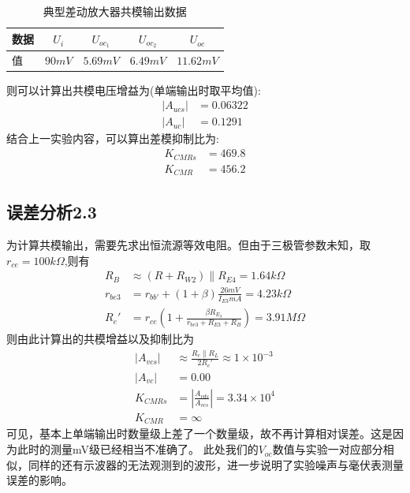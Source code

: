 \documentclass[a4paper,11pt,UTF8]{ctexart}
\begin{document}
	\begin{table}[!h!tbp]
		\caption{典型差动放大器共模输出数据}\label{tab:ncTab}
		\centering
		\begin{tabular}{|l|c|c|c|c|}
			\hline
			数据 &$U_{i}$&$U_{oc_1}$&$U_{oc_2}$&$U_{oc}$         \\ \hline
			值   &$90mV$&$5.69mV$&$6.49mV$&$11.62mV$     \\ \hline
		\end{tabular}
	\end{table}
	则可以计算出共模电压增益为(单端输出时取平均值):
	\begin{equation}
		\begin{aligned}
			\left | A_{ucs}\right |&=0.06322\\
			\left | A_{uc}\right |&=0.1291
		\end{aligned}
	\end{equation}
	结合上一实验内容，可以算出差模抑制比为:
	\begin{equation}
		\begin{aligned}
			K_{CMRs}&=469.8\\
			K_{CMR}&=456.2
		\end{aligned}
	\end{equation}
	\subsection{误差分析2.3}
	为计算共模输出，需要先求出恒流源等效电阻。但由于三极管参数未知，取$r_{ce}=100k\Omega$,则有
	\begin{equation}
		\begin{aligned}
			R_B&\approx(R+R_{W2})\parallel R_{E4}=1.64k\Omega\\
			r_{be3}&=r_{bb'}+(1+\beta)\frac{26mV}{I_{E3}mA}=4.23k\Omega\\
			R_e'&=r_{ce}(1+\frac{\beta R_{E_3}}{r_{be3}+R_{E3}+R_{B}})=3.91M\Omega
		\end{aligned}
	\end{equation}
	则由此计算出的共模增益以及抑制比为
	\begin{equation}
		\begin{aligned}
			\left | A_{vcs}\right |&\approx\frac{R_c\parallel R_L}{2R_e'}\approx1\times10^{-3}\\
			\left | A_{vc}\right |&=0.00\\
			K_{CMRs}&=\left |\frac{A_{vds}}{A_{vcs}}\right |=3.34\times10^{4}\\
			K_{CMR}&=\infty
		\end{aligned}
	\end{equation}
	可见，基本上单端输出时数量级上差了一个数量级，故不再计算相对误差。这是因为此时的测量mV级已经相当不准确了。
	此处我们的$V_{oc}$数值与实验一对应部分相似，同样的还有示波器的无法观测到的波形，进一步说明了实验噪声与毫伏表测量误差的影响。
\end{document}
